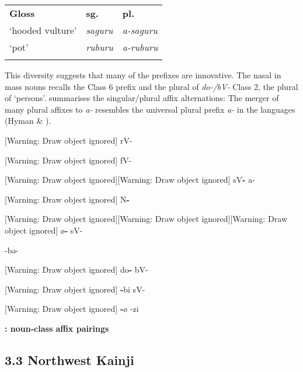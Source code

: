 \documentclass[output=paper]{langsci/langscibook}
\begin{document}
\begin{tabularx}{\textwidth}{XXX}
\lsptoprule
\textbf{Gloss} & \textbf{sg.} & \textbf{pl.}\\
‘hooded  vulture’ &  \textit{saguru} &  \textit{a-saguru}\\
‘pot’ &  \textit{ruburu} &  \textit{a-ruburu}\\
\lspbottomrule
\end{tabularx}
This diversity suggests that many of the prefixes are innovative. The nasal in mass nouns recalls the Class 6 prefix and the plural of \textit{do-/bV-} Class 2, the plural of ‘persons’.  summarises the  singular/plural affix alternations: The merger of many plural affixes to \textit{a-} resembles the universal plural prefix \textit{a-} in the  languages (Hyman \& \citealt{Magaji1970}).


[Warning: Draw object ignored] rV-



[Warning: Draw object ignored] fV-



[Warning: Draw object ignored][Warning: Draw object ignored] sV\textbf{{}-} a-



[Warning: Draw object ignored] N\textbf{{}-}



[Warning: Draw object ignored][Warning: Draw object ignored][Warning: Draw object ignored] ø\textbf{{}-} sV-



 {}-bə-



[Warning: Draw object ignored] do\textbf{{}-} bV-



[Warning: Draw object ignored] \textbf{{}-}bi sV-



[Warning: Draw object ignored] \textbf{{}-}ø {}-zi



\textbf{{:  noun-class affix pairings}}


\subsection{{3.3 Northwest Kainji}}
\end{document}

